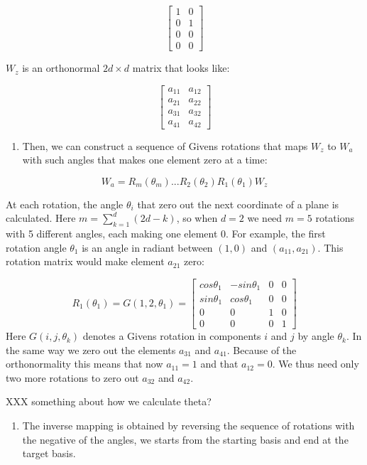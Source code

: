 \[ \begin{bmatrix}1 & 0 \\0  &1 \\ 0&0 \\0&0\end{bmatrix} \]

\(W_z\) is an orthonormal \(2d\times d\) matrix that looks like:

\[ \begin{bmatrix} a_{11} & a_{12} \\a_{21}  &a_{22} \\ a_{31}&a_{32} \\a_{41}&a_{42}\end{bmatrix} \]

\begin{enumerate}
\def\labelenumi{\arabic{enumi}.}
\setcounter{enumi}{2}
\tightlist
\item
  Then, we can construct a sequence of Givens rotations that maps
  \(W_z\) to \(W_a\) with such angles that makes one element zero at a
  time:
\end{enumerate}

\[ W_a = R_m(\theta_m) ... R_2(\theta_2)R_1(\theta_1)W_z\]

At each rotation, the angle \(\theta_i\) that zero out the next
coordinate of a plane is calculated. Here \(m = \sum_{k=1}^d (2d - k)\),
so when \(d=2\) we need \(m=5\) rotations with 5 different angles, each
making one element 0. For example, the first rotation angle \(\theta_1\)
is an angle in radiant between \((1, 0)\) and \((a_{11}, a_{21})\). This
rotation matrix would make element \(a_{21}\) zero:

\[R_1(\theta_1) = G(1, 2, \theta_1) = \begin{bmatrix} cos\theta_1 & -sin\theta_1 & 0 & 0 \\sin\theta_1  &cos\theta_1 & 0 &0 \\ 0&0&1&0 \\0&0&0&1\end{bmatrix}\]
Here \(G(i,j,\theta_k)\) denotes a Givens rotation in components \(i\)
and \(j\) by angle \(\theta_k\). In the same way we zero out the
elements \(a_{31}\) and \(a_{41}\). Because of the orthonormality this
means that now \(a_{11} = 1\) and that \(a_{12} = 0\). We thus need only
two more rotations to zero out \(a_{32}\) and \(a_{42}\).

XXX something about how we calculate theta?

\begin{enumerate}
\def\labelenumi{\arabic{enumi}.}
\setcounter{enumi}{3}
\tightlist
\item
  The inverse mapping is obtained by reversing the sequence of rotations
  with the negative of the angles, we starts from the starting basis and
  end at the target basis.
\end{enumerate}

